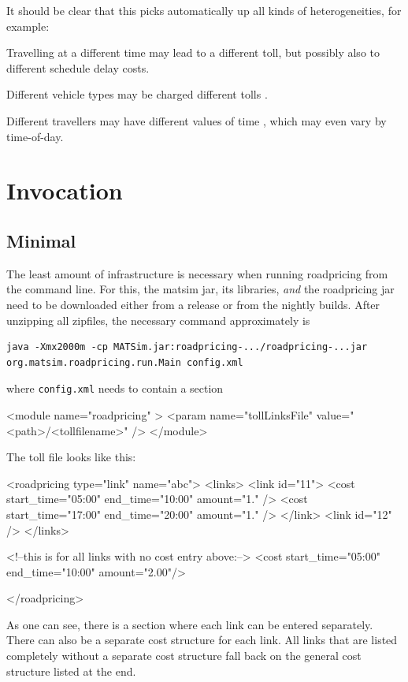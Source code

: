 It should be clear that this picks automatically up all kinds of heterogeneities, for example:
\begin{compactitem}

\item Travelling at a different time may lead to a different toll, but possibly also to different schedule delay costs. 

\item Different vehicle types may be charged different tolls \citep{KickhoeferNagel2012EmissionInternalization}.

\item Different travellers may have different values of time \citep{NagelKickhoeferJoubertHeterogeneousVoTs}, which may even vary by time-of-day.
  
\end{compactitem}

\section{Invocation}

\subsection{Minimal}

The least amount of infrastructure is necessary when running roadpricing from the command line.  For this, the \acrshort{matsim} jar, its libraries, \emph{and} the roadpricing jar need to be downloaded either from a release or from the nightly builds.   After unzipping all zipfiles, the necessary command approximately is
\begin{lstlisting}
java -Xmx2000m -cp MATSim.jar:roadpricing-.../roadpricing-...jar org.matsim.roadpricing.run.Main config.xml  
\end{lstlisting}
where \lstinline$config.xml$ needs to contain a section
\begin{xml}
	<module name="roadpricing" >
		<param name="tollLinksFile" value="<path>/<tollfilename>" />
	</module>
\end{xml}
The toll file looks like this:
\begin{xml}
<roadpricing type="link" name="abc">
   <links>
      <link id="11">
         <cost start_time="05:00" end_time="10:00" amount="1." />
         <cost start_time="17:00" end_time="20:00" amount="1." />
      </link>             
      <link id="12" />
   </links>

   <!--this is for all links with no cost entry above:-->
   <cost start_time="05:00" end_time="10:00" amount="2.00"/>

</roadpricing>
\end{xml}
As one can see, there is a section where each link can be entered separately.  There can also be a separate cost structure for each link.  All links that are listed completely without a separate cost structure fall back on the general cost structure listed at the end.

